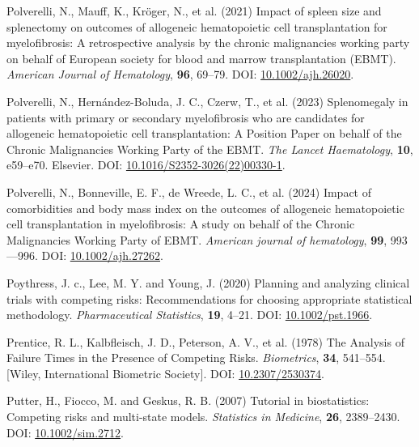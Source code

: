 \documentclass[
  letterpaper,
  DIV=11,
  numbers=noendperiod]{scrreprt}
\newlength{\cslhangindent}
\newenvironment{CSLReferences}[2] %
 {\begin{list}{}{%
  \setlength{\itemindent}{0pt}
  \setlength{\leftmargin}{0pt}
  \setlength{\parsep}{0pt}
  \ifodd #1
   \setlength{\leftmargin}{\cslhangindent}
   \setlength{\itemindent}{-1\cslhangindent}
  \fi
  \setlength{\itemsep}{#2\baselineskip}}}
 {\end{list}}
\begin{document}
\begin{CSLReferences}{1}{1}
Polverelli, N., Mauff, K., Kröger, N., et al. (2021) Impact of spleen
size and splenectomy on outcomes of allogeneic hematopoietic cell
transplantation for myelofibrosis: {A} retrospective analysis by the
chronic malignancies working party on behalf of {European} society for
blood and marrow transplantation ({EBMT}). \emph{American Journal of
Hematology}, \textbf{96}, 69--79. DOI:
\href{https://doi.org/10.1002/ajh.26020}{10.1002/ajh.26020}.

Polverelli, N., Hernández-Boluda, J. C., Czerw, T., et al. (2023)
Splenomegaly in patients with primary or secondary myelofibrosis who are
candidates for allogeneic hematopoietic cell transplantation: A
{Position Paper} on behalf of the {Chronic Malignancies Working Party}
of the {EBMT}. \emph{The Lancet Haematology}, \textbf{10}, e59--e70.
Elsevier. DOI:
\href{https://doi.org/10.1016/S2352-3026(22)00330-1}{10.1016/S2352-3026(22)00330-1}.

Polverelli, N., Bonneville, E. F., de Wreede, L. C., et al. (2024)
Impact of comorbidities and body mass index on the outcomes of
allogeneic hematopoietic cell transplantation in myelofibrosis: {A}
study on behalf of the {Chronic Malignancies Working Party} of {EBMT}.
\emph{American journal of hematology}, \textbf{99}, 993---996. DOI:
\href{https://doi.org/10.1002/ajh.27262}{10.1002/ajh.27262}.

Poythress, J. c., Lee, M. Y. and Young, J. (2020) Planning and analyzing
clinical trials with competing risks: {Recommendations} for choosing
appropriate statistical methodology. \emph{Pharmaceutical Statistics},
\textbf{19}, 4--21. DOI:
\href{https://doi.org/10.1002/pst.1966}{10.1002/pst.1966}.

Prentice, R. L., Kalbfleisch, J. D., Peterson, A. V., et al. (1978) The
{Analysis} of {Failure Times} in the {Presence} of {Competing Risks}.
\emph{Biometrics}, \textbf{34}, 541--554. {[}Wiley, International
Biometric Society{]}. DOI:
\href{https://doi.org/10.2307/2530374}{10.2307/2530374}.

Putter, H., Fiocco, M. and Geskus, R. B. (2007) Tutorial in
biostatistics: Competing risks and multi-state models. \emph{Statistics
in Medicine}, \textbf{26}, 2389--2430. DOI:
\href{https://doi.org/10.1002/sim.2712}{10.1002/sim.2712}.


\end{CSLReferences}
\end{document}
